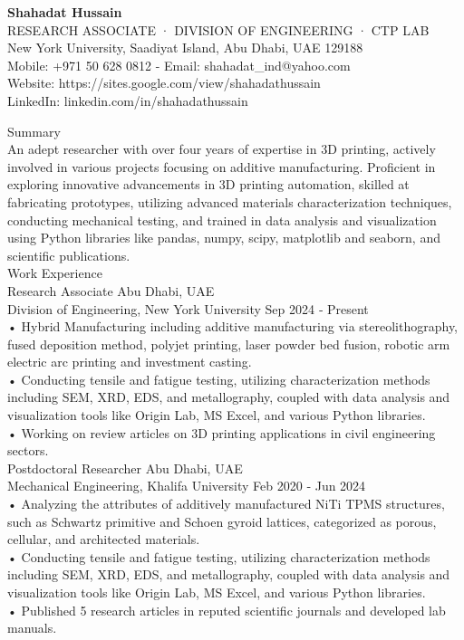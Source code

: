 \documentclass[a4paper]{article}
\begin{document}
\begin{center}

\textbf{\LARGE Shahadat Hussain}\\

RESEARCH ASSOCIATE · DIVISION OF ENGINEERING · CTP LAB\\
New York University, Saadiyat Island, Abu Dhabi, UAE 129188\\

Mobile: +971 50 628 0812 - Email: shahadat\_ind@yahoo.com\\
Website: https://sites.google.com/view/shahadathussain\\
LinkedIn: linkedin.com/in/shahadathussain\\

\end{center}

Summary\\
An adept researcher with over four years of expertise in 3D printing, actively involved in various projects focusing on additive
manufacturing. Proficient in exploring innovative advancements in 3D printing automation, skilled at fabricating
prototypes, utilizing advanced materials characterization techniques, conducting mechanical testing, and trained in
data analysis and visualization using Python libraries like pandas, numpy, scipy, matplotlib and seaborn, and scientific
publications.\\

Work Experience\\
Research Associate Abu Dhabi, UAE\\
Division of Engineering, New York University Sep 2024 ‑ Present\\
• Hybrid Manufacturing including additive manufacturing via stereolithography, fused deposition method, polyjet
printing, laser powder bed fusion, robotic arm electric arc printing and investment casting.\\
• Conducting tensile and fatigue testing, utilizing characterization methods including SEM, XRD, EDS, and metallography,
coupled with data analysis and visualization tools like Origin Lab, MS Excel, and various Python libraries.\\
• Working on review articles on 3D printing applications in civil engineering sectors.\\

Postdoctoral Researcher Abu Dhabi, UAE\\
Mechanical Engineering, Khalifa University Feb 2020 ‑ Jun 2024\\
• Analyzing the attributes of additively manufactured NiTi TPMS structures, such as Schwartz primitive and Schoen
gyroid lattices, categorized as porous, cellular, and architected materials.\\
• Conducting tensile and fatigue testing, utilizing characterization methods including SEM, XRD, EDS, and metallography,
coupled with data analysis and visualization tools like Origin Lab, MS Excel, and various Python libraries.\\
• Published 5 research articles in reputed scientific journals and developed lab manuals.\\
\end{document}
